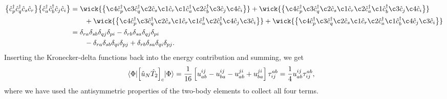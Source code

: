         \begin{align}
            \normalord{
                \ccr{p}
                \ccr{q}
                \can{s}
                \can{r}
            }
            \normalord{
                \ccr{a}
                \ccr{b}
                \can{j}
                \can{i}
            }
            &=
            \wick{
                \normalord{
                    \c4 {\ccr{p}}
                    \c3 {\ccr{q}}
                    \c2 {\can{s}}
                    \c1 {\can{r}}
                    \c1 {\ccr{a}}
                    \c2 {\ccr{b}}
                    \c3 {\can{j}}
                    \c4 {\can{i}}
                }
            }
            +
            \wick{
                \normalord{
                    \c4 {\ccr{p}}
                    \c3 {\ccr{q}}
                    \c2 {\can{s}}
                    \c1 {\can{r}}
                    \c2 {\ccr{a}}
                    \c1 {\ccr{b}}
                    \c3 {\can{j}}
                    \c4 {\can{i}}
                }
            }
            \nonumber \\
            &\qquad
            +
            \wick{
                \normalord{
                    \c4 {\ccr{p}}
                    \c3 {\ccr{q}}
                    \c2 {\can{s}}
                    \c1 {\can{r}}
                    \c1 {\ccr{a}}
                    \c2 {\ccr{b}}
                    \c4 {\can{j}}
                    \c3 {\can{i}}
                }
            }
            +
            \wick{
                \normalord{
                    \c4 {\ccr{p}}
                    \c3 {\ccr{q}}
                    \c2 {\can{s}}
                    \c1 {\can{r}}
                    \c2 {\ccr{a}}
                    \c1 {\ccr{b}}
                    \c4 {\can{j}}
                    \c3 {\can{i}}
                }
            }
            \\
            &=
            \delta_{ra}
            \delta_{sb}
            \delta_{qj}
            \delta_{pi}
            -
            \delta_{rb}
            \delta_{sa}
            \delta_{qj}
            \delta_{pi}
            \nonumber \\
            &\qquad
            -
            \delta_{ra}
            \delta_{sb}
            \delta_{qi}
            \delta_{pj}
            +
            \delta_{rb}
            \delta_{sa}
            \delta_{qi}
            \delta_{pj}.
        \end{align}
        Inserting the Kronecker-delta functions back into the energy
        contribution and summing, we get
        \begin{align}
            \mel*{\Phi}{
                \left[ 
                    \hat{u}_N \hat{T}_2
                 \right]_c
            }{\Phi}
            &=
            \frac{1}{16}\left[ 
                u^{ij}_{ab}
                - u^{ij}_{ba}
                - u^{ji}_{ab}
                + u^{ji}_{ba}
             \right]\tau^{ab}_{ij}
            =
            \frac{1}{4}u^{ij}_{ab}\tau^{ab}_{ij},
        \end{align}
        where we have used the antisymmetric properties of the two-body
        elements to collect all four terms.

